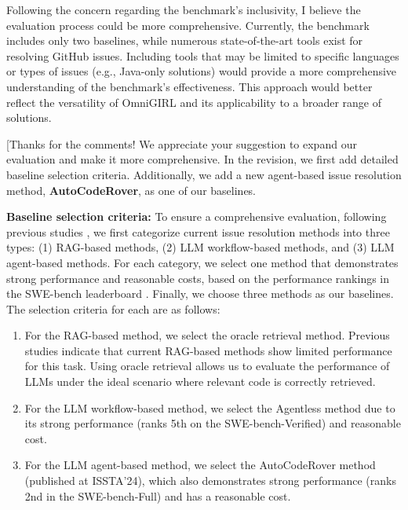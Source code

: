 \documentclass[12pt,american]{article}
\begin{document}
\begin{revcomment}
Following the concern regarding the benchmark's inclusivity, I believe the evaluation process could be more comprehensive. Currently, the benchmark includes only two baselines, while numerous state-of-the-art tools exist for resolving GitHub issues. Including tools that may be limited to specific languages or types of issues (e.g., Java-only solutions) would provide a more comprehensive understanding of the benchmark's effectiveness. This approach would better reflect the versatility of OmniGIRL and its applicability to a broader range of solutions.

\end{revcomment}
\begin{revresponse}[Thanks for the comments! We appreciate your suggestion to expand our evaluation and make it more comprehensive. In the revision, we first add detailed baseline selection criteria. Additionally, we add a new agent-based issue resolution method, \textbf{AutoCodeRover}, as one of our baselines.

\textbf{Baseline selection criteria:} To ensure a comprehensive evaluation, following previous studies , we first categorize current issue resolution methods into three types: (1) RAG-based methods, (2) LLM workflow-based methods, and (3) LLM agent-based methods. For each category, we select one method that demonstrates strong performance and reasonable costs, based on the performance rankings in the SWE-bench leaderboard \text{[Ref4]}. Finally, we choose three methods as our baselines. The selection criteria for each are as follows:
\begin{enumerate}
    \item For the RAG-based method, we select the oracle retrieval method. Previous studies \text{[Ref5]} indicate that current RAG-based methods show limited performance for this task. Using oracle retrieval allows us to evaluate the performance of LLMs under the ideal scenario where relevant code is correctly retrieved.
    \item For the LLM workflow-based method, we select the Agentless method due to its strong performance (ranks 5th on the SWE-bench-Verified) \text{[Ref4]} and reasonable cost.
    \item For the LLM agent-based method, we select the AutoCodeRover \text{[Ref6]} method (published at ISSTA'24), which also demonstrates strong performance (ranks 2nd in the SWE-bench-Full) \text{[Ref4]} and has a reasonable cost.
\end{enumerate}


\end{revresponse}
\end{document}
